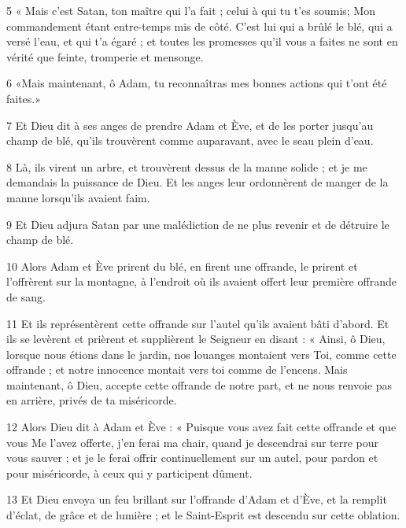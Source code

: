 \par 5 « Mais c'est Satan, ton maître qui l'a fait ; celui à qui tu t'es soumis; Mon commandement étant entre-temps mis de côté. C'est lui qui a brûlé le blé, qui a versé l'eau, et qui t'a égaré ; et toutes les promesses qu'il vous a faites ne sont en vérité que feinte, tromperie et mensonge.

\par 6 «Mais maintenant, ô Adam, tu reconnaîtras mes bonnes actions qui t'ont été faites.»

\par 7 Et Dieu dit à ses anges de prendre Adam et Ève, et de les porter jusqu'au champ de blé, qu'ils trouvèrent comme auparavant, avec le seau plein d'eau.

\par 8 Là, ils virent un arbre, et trouvèrent dessus de la manne solide ; et je me demandais la puissance de Dieu. Et les anges leur ordonnèrent de manger de la manne lorsqu'ils avaient faim.

\par 9 Et Dieu adjura Satan par une malédiction de ne plus revenir et de détruire le champ de blé.

\par 10 Alors Adam et Ève prirent du blé, en firent une offrande, le prirent et l'offrèrent sur la montagne, à l'endroit où ils avaient offert leur première offrande de sang.

\par 11 Et ils représentèrent cette offrande sur l'autel qu'ils avaient bâti d'abord. Et ils se levèrent et prièrent et supplièrent le Seigneur en disant : « Ainsi, ô Dieu, lorsque nous étions dans le jardin, nos louanges montaient vers Toi, comme cette offrande ; et notre innocence montait vers toi comme de l'encens. Mais maintenant, ô Dieu, accepte cette offrande de notre part, et ne nous renvoie pas en arrière, privés de ta miséricorde.

\par 12 Alors Dieu dit à Adam et Ève : « Puisque vous avez fait cette offrande et que vous Me l'avez offerte, j'en ferai ma chair, quand je descendrai sur terre pour vous sauver ; et je le ferai offrir continuellement sur un autel, pour pardon et pour miséricorde, à ceux qui y participent dûment.

\par 13 Et Dieu envoya un feu brillant sur l'offrande d'Adam et d'Ève, et la remplit d'éclat, de grâce et de lumière ; et le Saint-Esprit est descendu sur cette oblation.

